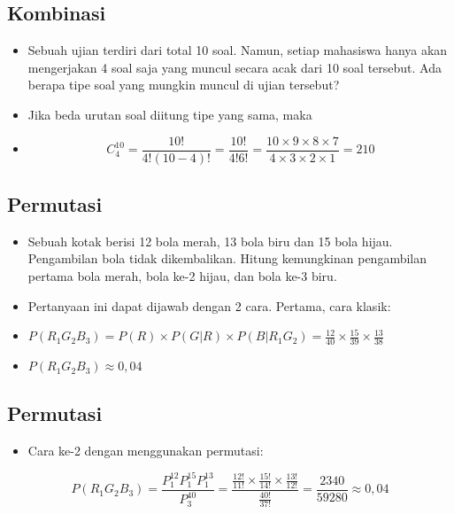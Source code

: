 \documentclass[
  letterpaper,
  DIV=11,
  numbers=noendperiod]{scrartcl}
\providecommand{\tightlist}{%
  \setlength{\itemsep}{0pt}\setlength{\parskip}{0pt}}\usepackage{longtable,booktabs,array}
\begin{document}
\subsection{Kombinasi}\label{kombinasi}

\begin{itemize}
\item
  Sebuah ujian terdiri dari total 10 soal. Namun, setiap mahasiswa hanya
  akan mengerjakan 4 soal saja yang muncul secara acak dari 10 soal
  tersebut. Ada berapa tipe soal yang mungkin muncul di ujian tersebut?
\item
  Jika beda urutan soal diitung tipe yang sama, maka
\item
  \[C^{10}_4=\frac{10!}{4!(10-4)!}=\frac{10!}{4!6!}=\frac{10\times9\times 8\times 7}{4 \times 3\times 2\times 1}=210\]
\end{itemize}

\subsection{Permutasi}\label{permutasi-1}

\begin{itemize}
\item
  Sebuah kotak berisi 12 bola merah, 13 bola biru dan 15 bola hijau.
  Pengambilan bola tidak dikembalikan. Hitung kemungkinan pengambilan
  pertama bola merah, bola ke-2 hijau, dan bola ke-3 biru.
\item
  Pertanyaan ini dapat dijawab dengan 2 cara. Pertama, cara klasik:
\item
  \(P(R_1G_2B_3)=P(R) \times P(G|R) \times P(B|R_1G_2)=\frac{12}{40} \times \frac{15}{39} \times \frac{13}{38}\)
\item
  \(P(R_1G_2B_3) \approx 0,04\)
\end{itemize}

\subsection{Permutasi}\label{permutasi-2}

\begin{itemize}
\tightlist
\item
  Cara ke-2 dengan menggunakan permutasi:
\end{itemize}

\[
P(R_1G_2B_3)=\frac{P^{12}_1P^{15}_1P^{13}_1}{P^{40}_3}=\frac{\frac{12!}{11!}\times\frac{15!}{14!}\times\frac{13!}{12!}}{\frac{40!}{37!}}=\frac{2340}{59280} \approx 0,04
\]
\end{document}
